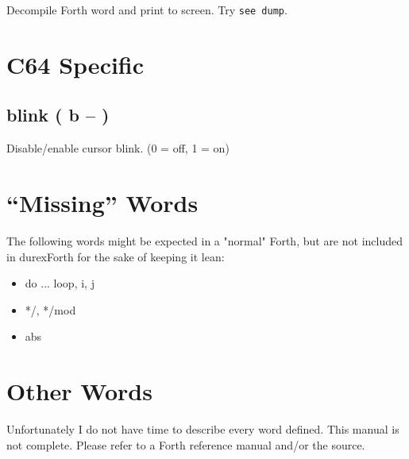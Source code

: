 Decompile Forth word and print to screen. Try \texttt{see dump}.

\section{C64 Specific}

\subsection{blink ( b -- )}

Disable/enable cursor blink. (0 = off, 1 = on)


\section{``Missing'' Words}

The following words might be expected in a "normal" Forth, but are not included in durexForth for the sake of keeping it lean:

\begin{itemize}
\item do ... loop, i, j
\item */, */mod
\item abs
\end{itemize}


\section{Other Words}

Unfortunately I do not have time to describe every word defined. This manual is not complete. Please refer to a Forth reference manual and/or the source.
